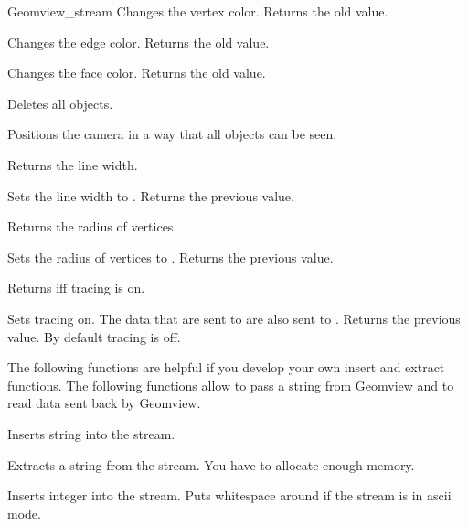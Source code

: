 \begin{ccClass}{Geomview_stream}
{Changes the vertex color. Returns the old value.}

{Changes the edge color. Returns the old value.}


{Changes the face color. Returns the old value.}



{Deletes all objects.}

{Positions the camera in a way that all objects can be seen.}

{Returns the line width.}

{Sets the line width to . Returns the previous value.}

{Returns the radius of vertices.}

{Sets the radius of vertices to . Returns the previous value.}

{Returns  iff tracing is on.}

{Sets tracing on. The data that are sent to  are also
 sent to .  Returns the previous value. By default tracing is
 off.}



\newpage
\begin{ccAdvanced}


The following functions are helpful if you develop your own insert
and extract functions. The following functions allow to pass a string
from Geomview and to read data sent back by Geomview.

{Inserts string  into the stream.}


{Extracts a string  from the stream.
\ccPrecond You have to allocate enough memory.}

{Inserts integer  into the stream. Puts whitespace around if the
stream is in ascii mode.}



\end{ccAdvanced}
\end{ccClass}
